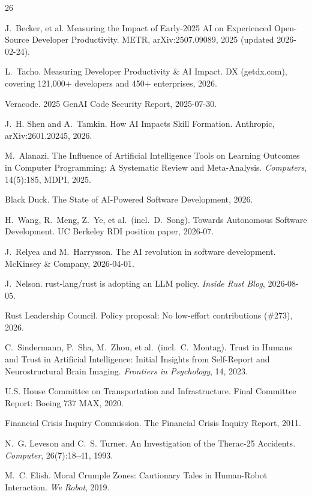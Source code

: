 \documentclass[11pt]{article}
\begin{document}
\begin{thebibliography}{26}

 J.~Becker, et al. Measuring the Impact of Early-2025 AI on
Experienced Open-Source Developer Productivity. METR, arXiv:2507.09089,
2025 (updated 2026-02-24).

 L.~Tacho. Measuring Developer Productivity \& AI Impact. DX
(getdx.com), covering 121{,}000$+$ developers and 450$+$ enterprises, 2026.

 Veracode. 2025 GenAI Code Security Report, 2025-07-30.

 J.~H. Shen and A.~Tamkin. How AI Impacts Skill
Formation. Anthropic, arXiv:2601.20245, 2026.

 M.~Alanazi. The Influence of Artificial Intelligence
Tools on Learning Outcomes in Computer Programming: A Systematic Review
and Meta-Analysis. \emph{Computers}, 14(5):185, MDPI, 2025.

 Black Duck. The State of AI-Powered Software
Development, 2026.

 H.~Wang, R.~Meng, Z.~Ye, et al.\ (incl.\ D.~Song).
Towards Autonomous Software Development. UC Berkeley RDI position paper,
2026-07.

 J.~Relyea and M.~Harrysson. The AI revolution in
software development. McKinsey \& Company, 2026-04-01.

 J.~Nelson. rust-lang/rust is adopting an LLM policy.
\emph{Inside Rust Blog}, 2026-08-05.

 Rust Leadership Council. Policy proposal: No
low-effort contributions (\#273), 2026.

 C.~Sindermann, P.~Sha, M.~Zhou, et al.\ (incl.\
C.~Montag). Trust in Humans and Trust in Artificial Intelligence: Initial
Insights from Self-Report and Neurostructural Brain Imaging.
\emph{Frontiers in Psychology}, 14, 2023.

 U.S. House Committee on Transportation and Infrastructure.
Final Committee Report: Boeing 737 MAX, 2020.

 Financial Crisis Inquiry Commission. The Financial Crisis
Inquiry Report, 2011.

 N.~G. Leveson and C.~S. Turner. An Investigation of the
Therac-25 Accidents. \emph{Computer}, 26(7):18--41, 1993.

 M.~C. Elish. Moral Crumple Zones: Cautionary Tales in
Human-Robot Interaction. \emph{We Robot}, 2019.


\end{thebibliography}
\end{document}

